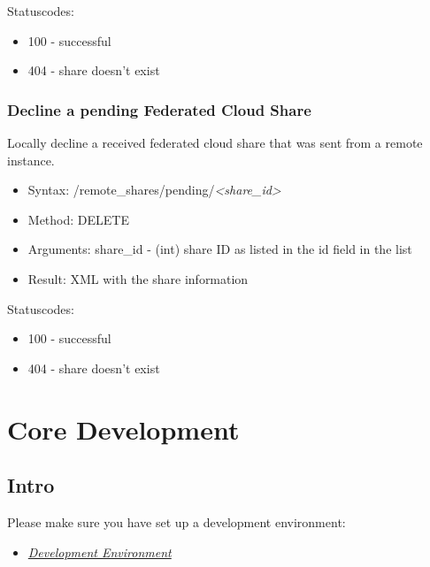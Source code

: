 \documentclass[letterpaper,10pt,english]{sphinxmanual}
\begin{document}
Statuscodes:
\begin{itemize}
\item {} 
100 - successful

\item {} 
404 - share doesn't exist

\end{itemize}


\subsubsection{Decline a pending Federated Cloud Share}
\label{core/ocs-share-api:decline-a-pending-federated-cloud-share}
Locally decline a received federated cloud share that was sent from a remote instance.
\begin{itemize}
\item {} 
Syntax: /remote\_shares/pending/\emph{\textless{}share\_id\textgreater{}}

\item {} 
Method: DELETE

\item {} 
Arguments: share\_id - (int) share ID as listed in the id field in the  list

\item {} 
Result: XML with the share information

\end{itemize}

Statuscodes:
\begin{itemize}
\item {} 
100 - successful

\item {} 
404 - share doesn't exist

\end{itemize}


\section{Core Development}
\label{core/index:core-development}

\subsection{Intro}
\label{core/index:intro}
Please make sure you have set up a development environment:
\begin{itemize}
\item {} 
{\hyperref[general/devenv::doc]{\emph{Development Environment}}}

\end{itemize}
\end{document}
